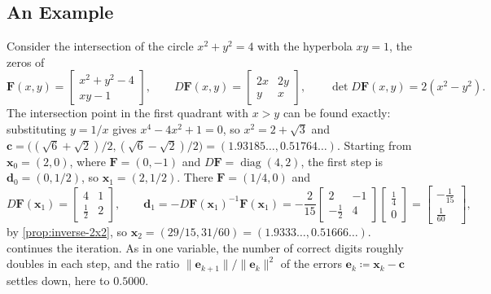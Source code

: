 \subsection{An Example}

Consider the intersection of the circle $x^2+y^2=4$ with the hyperbola $xy=1$, the zeros of
\[
\mathbf F(x,y)=\begin{bmatrix}x^2+y^2-4\\xy-1\end{bmatrix},\qquad D\mathbf F(x,y)=\begin{bmatrix}2x&2y\\y&x\end{bmatrix},\qquad\det D\mathbf F(x,y)=2(x^2-y^2).
\]
The intersection point in the first quadrant with $x>y$ can be found exactly: substituting $y=1/x$ gives $x^4-4x^2+1=0$, so $x^2=2+\sqrt3$ and $\mathbf c=\bigl((\sqrt6+\sqrt2)/2,(\sqrt6-\sqrt2)/2\bigr)=(1.93185\ldots,0.51764\ldots)$. Starting from $\mathbf x_0=(2,0)$, where $\mathbf F=(0,-1)$ and $D\mathbf F=\operatorname{diag}(4,2)$, the first step is $\mathbf d_0=(0,1/2)$, so $\mathbf x_1=(2,1/2)$. There $\mathbf F=(1/4,0)$ and
\[
D\mathbf F(\mathbf x_1)=\begin{bmatrix}4&1\\\frac12&2\end{bmatrix},\qquad\mathbf d_1=-D\mathbf F(\mathbf x_1)^{-1}\mathbf F(\mathbf x_1)=-\frac2{15}\begin{bmatrix}2&-1\\-\frac12&4\end{bmatrix}\begin{bmatrix}\frac14\\0\end{bmatrix}=\begin{bmatrix}-\frac1{15}\\\frac1{60}\end{bmatrix},
\]
by \cref{prop:inverse-2x2}, so $\mathbf x_2=(29/15,31/60)=(1.9333\ldots,0.51666\ldots)$.  continues the iteration. As in one variable, the number of correct digits roughly doubles in each step, and the ratio $\|\mathbf e_{k+1}\|/\|\mathbf e_k\|^2$ of the errors $\mathbf e_k\coloneqq\mathbf x_k-\mathbf c$ settles down, here to $0.5000$.

